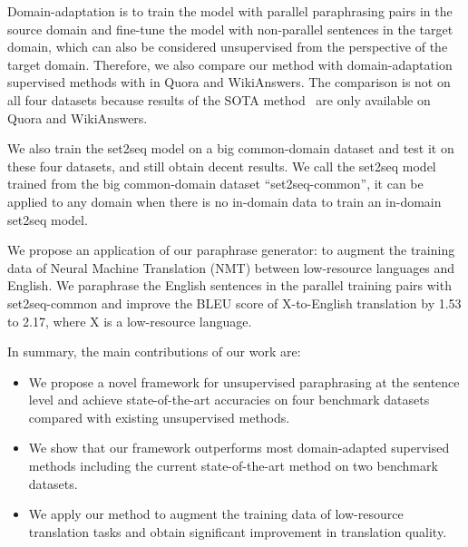 Domain-adaptation is to train the model with parallel paraphrasing pairs 
in the source domain and fine-tune the model with non-parallel sentences 
in the target domain, which can also be considered unsupervised from 
the perspective of the target domain. Therefore, we also compare 
our method with domain-adaptation supervised methods with  in 
Quora and WikiAnswers. The comparison is not on all four datasets 
because results of the SOTA method~\citep{li2019decomposable} are only 
available on Quora and WikiAnswers.

We also train the set2seq model on a big common-domain dataset and test it on these four datasets, and still obtain decent results. We call the set2seq model trained from the big common-domain dataset ``set2seq-common'', it can be applied to any domain when there is no in-domain data to train an in-domain set2seq model.


We propose an application of our paraphrase generator: 
to augment the training data of 
Neural Machine Translation (NMT) between low-resource languages and English. 
We paraphrase the English sentences in the parallel training pairs with set2seq-common and 
improve the BLEU score of X-to-English translation by 1.53 to 2.17, 
where X is a low-resource language.

In summary, the main contributions of our work are:
\begin{itemize}
\item We propose a novel framework for unsupervised paraphrasing at 
the sentence level and achieve state-of-the-art accuracies on 
four benchmark datasets compared with existing unsupervised methods.
\item We show that our framework outperforms most domain-adapted supervised methods including the current state-of-the-art method on two benchmark datasets.
\item We apply our method to augment the training data of low-resource
translation tasks and obtain significant improvement in translation quality.
\end{itemize}
